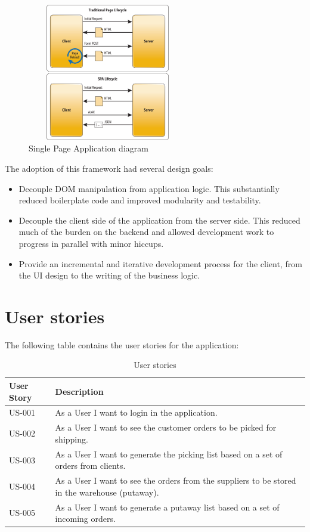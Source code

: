 \documentclass[a4paper]{article}
\begin{document}
\begin{figure}[h!]
\centerline{\includegraphics[height=6cm, width=7cm]{spa_diagram.png}}
\caption{Single Page Application diagram}
\end{figure}

The adoption of this framework had several design goals:

\begin{itemize}

	\item Decouple DOM manipulation from application logic. This substantially reduced boilerplate code and improved modularity and testability.
    
    \item Decouple the client side of the application from the server side. This reduced much of the burden on the backend and allowed development work to progress in parallel with minor hiccups.
    
    \item Provide an incremental and iterative development process for the client, from the UI design to the writing of the business logic.

\end{itemize}

\newpage

\section{User stories}

The following table contains the user stories for the application:
\begin{table}[h!]
\begin{adjustwidth}{-.7in}{-.7in}
\begin{tabular}{|l | l|}
\hline
User Story & Description \\ \hline
US-001 &
As a User I want to login in the application. \\ \hline
US-002 &
As a User I want to see the customer orders to be picked for shipping. \\ \hline
US-003 &
As a User I want to generate the picking list based on a set of orders from clients. \\ \hline
US-004 &
As a User I want to see the orders from the suppliers to be stored in the warehouse (putaway).
\\ \hline
US-005 &
As a User I want to generate a putaway list based on a set of incoming orders. \\ \hline
\end{tabular}
\caption{User stories}
\end{adjustwidth}
\end{table}
\end{document}
